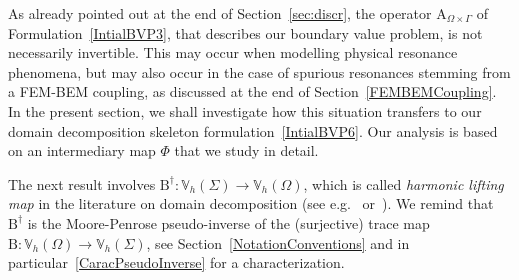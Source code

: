 \documentclass[a4paper,11pt]{article}
\newcommand{\mA}{\mathrm{A}}
\newcommand{\mB}{\mathrm{B}}
\newcommand{\mbV}{\mathbb{V}}
\begin{document}
As already pointed out at the end of Section~\ref{sec:discr}, the operator $\mA_{\Omega\times \Gamma}$ of Formulation~\eqref{IntialBVP3}, that
describes our boundary value problem, is not necessarily
invertible. This may occur when modelling physical resonance
phenomena, but may also occur in the case of spurious resonances
stemming from a FEM-BEM coupling, as discussed at the end of
Section~\ref{FEMBEMCoupling}. In the present section, we shall
investigate how this situation transfers to our domain decomposition skeleton formulation~\eqref{IntialBVP6}. Our analysis is based on an intermediary map \(\Phi\) that we study in detail.

The next result involves $\mB^{\dagger}\colon \mbV_h(\Sigma)\to \mbV_h(\Omega)$, which is called \emph{harmonic lifting map} in the literature on domain decomposition (see e.g.~\cite[\S 4.4]{MR2104179} or~\cite[\S 1.2.6]{MR3013465}). We remind that $\mB^{\dagger}$ is the Moore-Penrose pseudo-inverse of the (surjective) trace map
$\mB\colon \mbV_h(\Omega)\to \mbV_h(\Sigma)$, see Section~\ref{NotationConventions} and in particular~\eqref{CaracPseudoInverse}
for a characterization.
\end{document}
